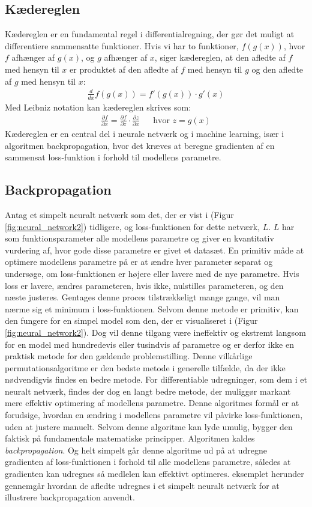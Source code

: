 \documentclass{article}
\newcommand{\figureref}[1]{(Figur \ref{#1})}
\begin{document}
\subsection{Kædereglen}
Kædereglen er en fundamental regel i differentialregning, der gør det muligt at differentiere sammensatte funktioner. Hvis vi har to funktioner, $f(g(x))$, hvor $f$ afhænger af $g(x)$, og $g$ afhænger af $x$, siger kædereglen, at den afledte af $f$ med hensyn til $x$ er produktet af den afledte af $f$ med hensyn til $g$ og den afledte af $g$ med hensyn til $x$:
\begin{align}
  \frac{d}{dx} f(g(x)) = f'(g(x)) \cdot g'(x)
\end{align}
Med Leibniz notation kan kædereglen skrives som:
\begin{align}
  \frac{\partial f}{\partial x} = \frac{\partial f}{\partial z} \cdot \frac{\partial z}{\partial x}
  &&
  \text{hvor } z = g(x)
\end{align}
Kædereglen er en central del i neurale netværk og i machine learning, især i algoritmen backpropagation, hvor det kræves at beregne gradienten af en sammensat loss-funktion i forhold til modellens parametre. \parencite{Kirsanov_2024}
\subsection{Backpropagation}
Antag et simpelt neuralt netværk som det, der er vist i \figureref{fig:neural_network2} tidligere, og loss-funktionen for dette netværk, $L$. $L$ har som funktionsparameter alle modellens parametre og giver en kvantitativ vurdering af, hvor gode disse parametre er givet et datasæt. En primitiv måde at optimere modellens parametre på er at ændre hver parameter separat og undersøge, om loss-funktionen er højere eller lavere med de nye parametre. Hvis loss er lavere, ændres parameteren, hvis ikke, nulstilles parameteren, og den næste justeres. Gentages denne proces tilstrækkeligt mange gange, vil man nærme sig et minimum i loss-funktionen. Selvom denne metode er primitiv, kan den fungere for en simpel model som den, der er visualiseret i \figureref{fig:neural_network2}. Dog vil denne tilgang være ineffektiv og ekstremt langsom for en model med hundredevis eller tusindvis af parametre og er derfor ikke en praktisk metode for den gældende problemstilling. Denne vilkårlige permutationsalgoritme er den bedste metode i generelle tilfælde, da der ikke nødvendigvis findes en bedre metode. \parencite{Kirsanov_2024} For differentiable udregninger, som dem i et neuralt netværk, findes der dog en langt bedre metode, der muliggør markant mere effektiv optimering af modellens parametre. Denne algoritmes formål er at forudsige, hvordan en ændring i modellens parametre vil påvirke loss-funktionen, uden at justere manuelt. Selvom denne algoritme kan lyde umulig, bygger den faktisk på fundamentale matematiske principper. Algoritmen kaldes \textit{backpropagation}. Og helt simpelt går denne algoritme ud på at udregne gradienten af loss-funktionen i forhold til alle modellens parametre, således at gradienten kan udregnes så medlelen kan effektivt optimeres. \parencite{Kirsanov_2024, Nielsen_2019b, Sanderson_2017} eksemplet herunder gennemgår hvordan de afledte udregnes i et simpelt neuralt netværk for at illustrere backpropagation anvendt.
\end{document}

